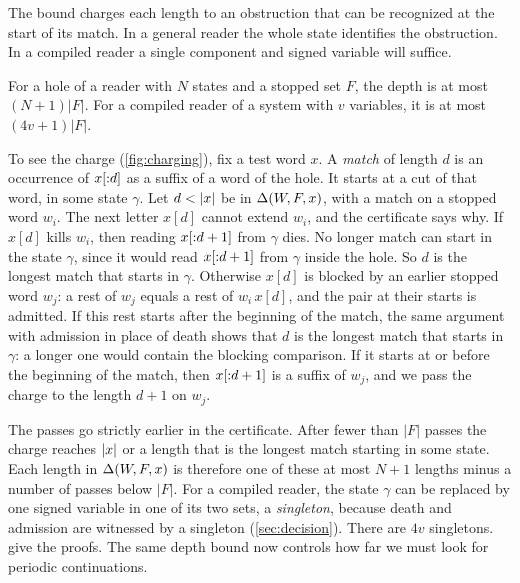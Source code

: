 The bound charges each length to an obstruction that can be recognized
at the start of its match. In a general reader the whole state identifies
the obstruction. In a compiled reader a single component and signed
variable will suffice.

\begin{lemma}\label{lem:depth}
For a hole of a reader with $N$ states and a stopped set $F$, the depth is
at most $(N+1)|F|$. For a compiled reader of a system with $v$ variables,
it is at most $(4v+1)|F|$.
\end{lemma}



To see the charge (\cref{fig:charging}), fix a test word $x$. A
\emph{match} of length $d$ is an
occurrence of $x[{:}d]$ as a suffix of a word of the hole. It starts at a
cut of that word, in some state $\gamma$. Let $d<\lvert x\rvert$ be in
$\Delta(W,F,x)$, with a match on a stopped word $w_i$. The next letter
$x[d]$ cannot extend $w_i$, and the certificate says why. If $x[d]$ kills
$w_i$, then reading $x[{:}d+1]$ from $\gamma$ dies. No longer match can
start in the state $\gamma$, since it would read $x[{:}d+1]$ from
$\gamma$ inside the hole. So $d$ is the longest match that starts in
$\gamma$. Otherwise $x[d]$ is blocked by an earlier stopped word $w_j$: a
rest of $w_j$ equals a rest of $w_i\,x[d]$, and the pair at their starts
is admitted. If this rest starts after the beginning of the match, the same
argument with admission in place of death shows that $d$ is the longest
match that starts in $\gamma$: a longer one would contain the blocking
comparison. If it starts at or before the beginning of the match, then
$x[{:}d+1]$ is a suffix of $w_j$, and we pass the charge to the length
$d+1$ on $w_j$.

The passes go strictly earlier in the certificate. After fewer than $|F|$
passes the charge reaches $\lvert x\rvert$ or a length that is the longest match
starting in some state. Each length in $\Delta(W,F,x)$ is therefore one
of these at most $N+1$ lengths minus a number of passes below $|F|$. For a
compiled reader, the state $\gamma$ can be replaced by one signed variable
in one of its two sets, a \emph{singleton}, because death and admission are
witnessed by a singleton (\cref{sec:decision}). There are $4v$ singletons.
 give the proofs. The same depth bound now
controls how far we must look for periodic continuations.
